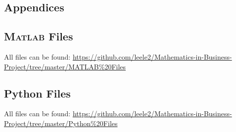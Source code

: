 \begin{appendices}
    \chapter*{Appendices}
    \addappheadtotoc
    \renewcommand{\setthesection}{\Alph{section}}
    \begin{subappendices}
        \section{\textsc{Matlab} Files}
        All files can be found: \small\url{https://github.com/leele2/Mathematics-in-Business-Project/tree/master/MATLAB%20Files}

            
            

        \section{Python Files}
            All files can be found: \small\url{https://github.com/leele2/Mathematics-in-Business-Project/tree/master/Python%20Files}

            

    \end{subappendices}
\end{appendices}